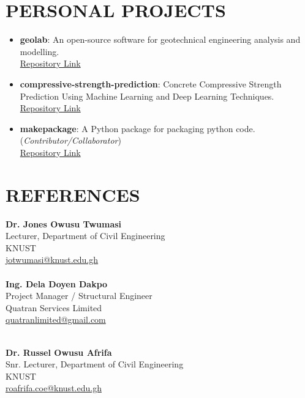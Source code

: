 \documentclass[letterpaper, 12pt]{article}
\newcommand{\cvsection}[1]{
	
	\section*{#1}
}
\begin{document}
	
	\cvsection{PERSONAL PROJECTS}
	
	\begin{itemize}[leftmargin=*]
		
		\item \textbf{geolab}: An open-source software for geotechnical engineering analysis and modelling. \\ \href{https://www.github.com/patrickboateng/geolab}{Repository Link}
		
		\item \textbf{compressive-strength-prediction}: Concrete Compressive Strength Prediction Using Machine Learning and Deep Learning Techniques. \href{https://github.com/patrickboateng/compressive-strength-prediction}{Repository Link}
		
		\item \textbf{makepackage}: A Python package for packaging python code. (\textit{Contributor/Collaborator}) \\
		\href{https://github.com/nyggus/makepackage/graphs/contributors}{Repository Link}
		
	\end{itemize}
	
	
	\cvsection{REFERENCES}
	
	
	\begin{multicols}{2}
		\textbf{Dr. Jones Owusu Twumasi} \\ 
		Lecturer, Department of Civil Engineering \\
		KNUST \\
		\faEnvelopeSquare \space \href{mailto:jotwumasi@knust.edu.gh}{jotwumasi@knust.edu.gh} \\
		\faPhone {} \\
		
		\textbf{Ing. Dela Doyen Dakpo} \\
		Project Manager / Structural Engineer \\
		Quatran Services Limited \\
		\faEnvelopeSquare \space \href{mailto:quatranlimited@gmail.com}{quatranlimited@gmail.com} \\
		\faPhone {} \\ 
		
		\columnbreak

		\textbf{Dr. Russel Owusu Afrifa} \\
		Snr. Lecturer, Department of Civil Engineering \\
		KNUST \\
		\faEnvelopeSquare \space \href{mailto:roafrifa.coe@knust.edu.gh}{roafrifa.coe@knust.edu.gh} \\
		\faPhone {} \\
		
	\end{multicols}
	
\end{document}
